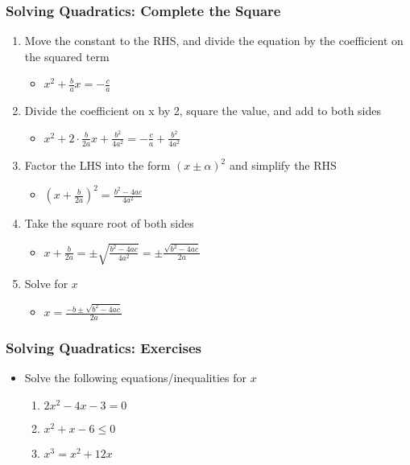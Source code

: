 \documentclass[pdflatex, 12pt]{beamer}
\begin{document}
\begin{frame}
\frametitle{Solving Quadratics: Complete the Square}
\begin{enumerate}
\item Move the constant to the RHS, and divide the equation by the coefficient on the squared term
 \begin{itemize}
 \item $x^2 + \frac{b}{a}x = -\frac{c}{a}$
 \end{itemize}
\vspace{0.2cm}
\item Divide the coefficient on x by 2, square the value, and add to both sides
 \begin{itemize}
 \item $x^2 + 2 \cdot \frac{b}{2a}x + \frac{b^2}{4a^2} = -\frac{c}{a} + \frac{b^2}{4a^2}$
 \end{itemize}
\vspace{0.2cm}
\item Factor the LHS into the form $(x \pm \alpha)^2$ and simplify the RHS
 \begin{itemize}
 \item $(x + \frac{b}{2a})^2 = \frac{b^2 - 4ac}{4a^2}$
 \end{itemize}
\vspace{0.2cm}
\item Take the square root of both sides
 \begin{itemize}
 \item $x + \frac{b}{2a} = \pm \sqrt{\frac{b^2 - 4ac}{4a^2}} = \pm \frac{\sqrt{b^2 - 4ac}}{2a}$
 \end{itemize}
\vspace{0.2cm}
\item Solve for $x$
 \begin{itemize}
 \item $x = \frac{-b \pm \sqrt{b^2 - 4ac}}{2a}$
 \end{itemize}
\end{enumerate}
\end{frame}

\begin{frame}
\frametitle{Solving Quadratics: Exercises}
\begin{itemize}
\item Solve the following equations/inequalities for $x$
 \begin{enumerate}
 \item $2x^2 - 4x - 3 = 0$
 \item $x^2 + x - 6 \leq 0$
 \item $x^3 = x^2 + 12x$
 \end{enumerate}
\end{itemize}
\end{frame}
\end{document}
